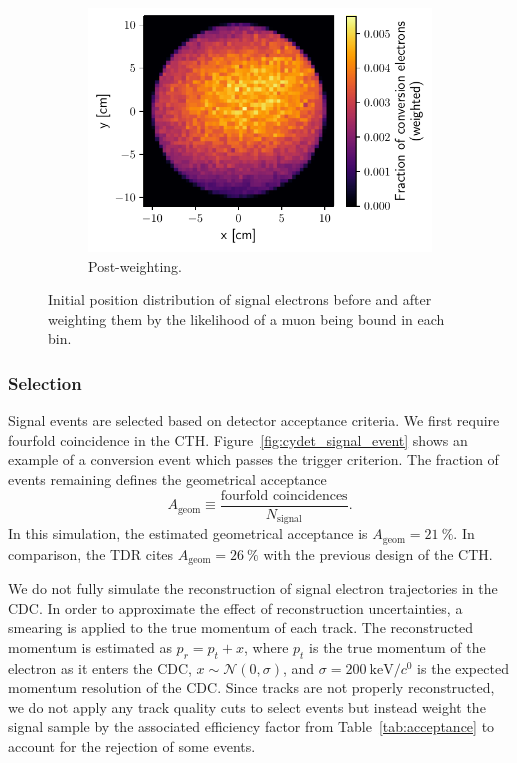 \begin{figure}
\begin{subfigure}[t]{0.329\textwidth}
        \centering
        \includegraphics[width=\textwidth]{chapter6/weighted_conversion_position_distribution.pdf}
        \caption{Post-weighting.}
    \end{subfigure}
    \caption{ Initial position distribution of signal electrons before and after
        weighting them by the likelihood of a muon being bound in each bin. }
    \label{fig:stopping_position_reweighting}
\end{figure}


\subsubsection{Selection}
Signal events are selected based on detector acceptance criteria. We first
require fourfold coincidence in the CTH. Figure~\ref{fig:cydet_signal_event}
shows an example of a conversion event which passes the trigger criterion. The
fraction of events remaining defines the geometrical acceptance 
$$
A_\mathrm{geom} \equiv  \frac{\text{fourfold coincidences}}{N_\mathrm{signal}}.
$$
In this simulation, the estimated geometrical acceptance is $A_\mathrm{geom} =
\SI{21}{\percent}$. In comparison, the TDR cites $A_\mathrm{geom} =
\SI{26}{\percent}$ with the previous design of the CTH.


We do not fully simulate the reconstruction of signal electron trajectories in
the CDC. In order to approximate the effect of reconstruction uncertainties, a
smearing is applied to the true momentum of each track. The reconstructed
momentum is estimated as $p_r = p_t + x$, where $p_t$ is the true momentum of
the electron as it enters the CDC, $x \sim \mathcal{N}(0, \sigma)$, and $\sigma
= \SI{200}{\keV/\clight}$ is the expected momentum resolution of the CDC. Since
tracks are not properly reconstructed, we do not apply any track quality cuts to
select events but instead weight the signal sample by the associated efficiency
factor from Table~\ref{tab:acceptance} to account for the rejection of some events.

